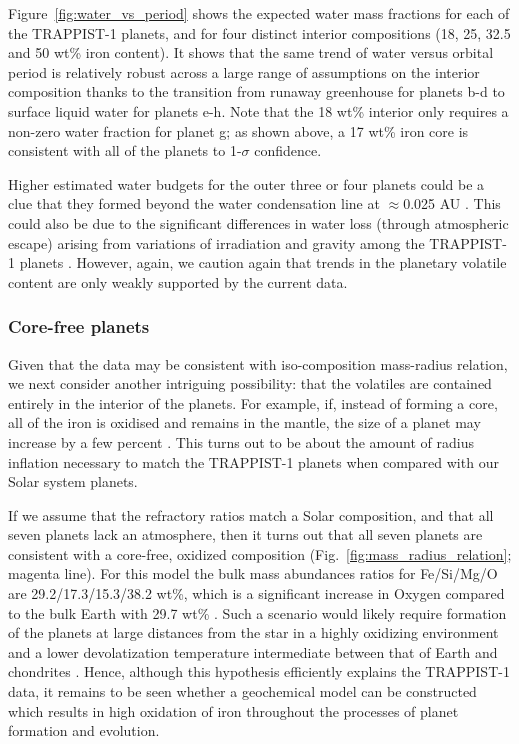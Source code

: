 \documentclass[fleqn,usenatbib]{mnras} %
\begin{document}
Figure~\ref{fig:water_vs_period} shows the expected water mass fractions for each of the TRAPPIST-1 planets, and for four distinct interior compositions (18, 25, 32.5 and 50 wt\% iron content). It shows that the same trend of water versus orbital period is relatively robust across a large range of assumptions on the interior composition thanks to the transition from runaway greenhouse for planets b-d to surface liquid water for planets e-h.  Note that the 18 wt\% interior only requires a non-zero water fraction for planet g;  as shown above, a 17 wt\% iron core is consistent with all of the planets to 1-$\sigma$ confidence.

Higher estimated water budgets for the outer three or four planets could be a clue that they formed beyond the water condensation line at $\approx$0.025 AU \citep{Unterborn2018a}. This could also be due to the significant differences in water loss (through atmospheric escape) arising from variations of irradiation and gravity among the TRAPPIST-1 planets \citep{Lissauer2007, Bolmont2017,Bourrier2017}.  However, again, we caution again that trends in the planetary volatile content are only weakly supported by the current data.

\subsubsection{Core-free planets} \label{sec:core_free}

Given that the data may be consistent with iso-composition mass-radius relation, we next consider another intriguing possibility:
 that the volatiles are contained entirely in the interior of the planets.  For example, if, instead of forming a core, all of the iron is oxidised and remains in the mantle, the size of a planet may increase by a few percent \citep{ElkinsTanton2008}.  This turns out to be about the amount of radius inflation necessary to match the TRAPPIST-1 planets when compared with our Solar system planets.   
 
 If we assume that the refractory ratios match a Solar composition, and that all seven planets lack an atmosphere, then it turns out that all seven planets are consistent with a core-free, oxidized composition (Fig.\ \ref{fig:mass_radius_relation}; magenta line).  For this model the bulk mass abundances ratios for Fe/Si/Mg/O are 29.2/17.3/15.3/38.2 wt\%, which is a significant increase in Oxygen compared to the bulk Earth with 29.7 wt\% \citep{McDonough2014}.
  Such a scenario would likely require formation of the planets at large distances from the star in a highly oxidizing environment \citep{ElkinsTanton2008} and a lower  devolatization temperature intermediate between that of Earth and chondrites \citep{Wang2019}.  Hence, although this hypothesis efficiently explains the TRAPPIST-1 data, it remains to be seen whether a geochemical model can be constructed which results in high oxidation of iron throughout the processes of planet formation and evolution.
\end{document}
